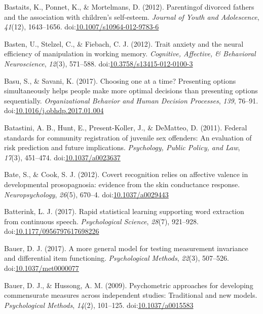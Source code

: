 \documentclass[english,man]{apa6}
\begin{document}
\hypertarget{ref-Bastaits2012}{}
Bastaits, K., Ponnet, K., \& Mortelmans, D. (2012). Parentingof divorced
fathers and the association with children's self-esteem. \emph{Journal
of Youth and Adolescence}, \emph{41}(12), 1643--1656.
doi:\href{https://doi.org/10.1007/s10964-012-9783-6}{10.1007/s10964-012-9783-6}

\hypertarget{ref-Basten2012}{}
Basten, U., Stelzel, C., \& Fiebach, C. J. (2012). Trait anxiety and the
neural efficiency of manipulation in working memory. \emph{Cognitive,
Affective, \& Behavioral Neuroscience}, \emph{12}(3), 571--588.
doi:\href{https://doi.org/10.3758/s13415-012-0100-3}{10.3758/s13415-012-0100-3}

\hypertarget{ref-Basu2017}{}
Basu, S., \& Savani, K. (2017). Choosing one at a time? Presenting
options simultaneously helps people make more optimal decisions than
presenting options sequentially. \emph{Organizational Behavior and Human
Decision Processes}, \emph{139}, 76--91.
doi:\href{https://doi.org/10.1016/j.obhdp.2017.01.004}{10.1016/j.obhdp.2017.01.004}

\hypertarget{ref-Batastini2011}{}
Batastini, A. B., Hunt, E., Present-Koller, J., \& DeMatteo, D. (2011).
Federal standards for community registration of juvenile sex offenders:
An evaluation of risk prediction and future implications.
\emph{Psychology, Public Policy, and Law}, \emph{17}(3), 451--474.
doi:\href{https://doi.org/10.1037/a0023637}{10.1037/a0023637}

\hypertarget{ref-Bate2012}{}
Bate, S., \& Cook, S. J. (2012). Covert recognition relies on affective
valence in developmental prosopagnosia: evidence from the skin
conductance response. \emph{Neuropsychology}, \emph{26}(5), 670--4.
doi:\href{https://doi.org/10.1037/a0029443}{10.1037/a0029443}

\hypertarget{ref-Batterink2017}{}
Batterink, L. J. (2017). Rapid statistical learning supporting word
extraction from continuous speech. \emph{Psychological Science},
\emph{28}(7), 921--928.
doi:\href{https://doi.org/10.1177/0956797617698226}{10.1177/0956797617698226}

\hypertarget{ref-Bauer2016}{}
Bauer, D. J. (2017). A more general model for testing measurement
invariance and differential item functioning. \emph{Psychological
Methods}, \emph{22}(3), 507--526.
doi:\href{https://doi.org/10.1037/met0000077}{10.1037/met0000077}

\hypertarget{ref-Bauer2009}{}
Bauer, D. J., \& Hussong, A. M. (2009). Psychometric approaches for
developing commensurate measures across independent studies: Traditional
and new models. \emph{Psychological Methods}, \emph{14}(2), 101--125.
doi:\href{https://doi.org/10.1037/a0015583}{10.1037/a0015583}
\end{document}
